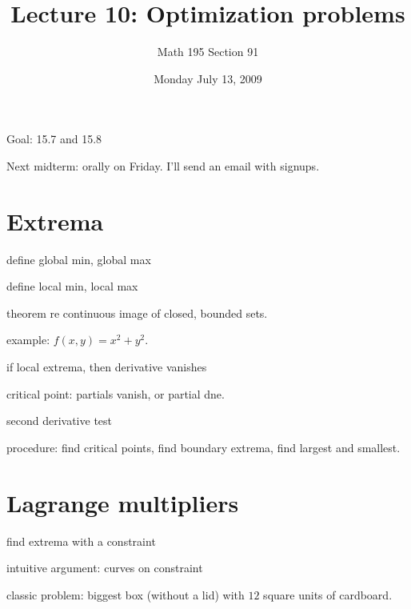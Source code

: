\documentclass[12pt]{article}
\title{Lecture 10: Optimization problems}
\author{Math 195 Section 91}
\date{Monday July 13, 2009}
\begin{document}
\maketitle

Goal: 15.7 and 15.8

Next midterm: orally on Friday.  I'll send an email with signups.

\section{Extrema}

define global min, global max

define local min, local max

theorem re continuous image of closed, bounded sets.

example: $f(x,y) = x^2 + y^2$.

if local extrema, then derivative vanishes

critical point: partials vanish, or partial dne.

second derivative test

procedure: find critical points, find boundary extrema, find largest and smallest.

\section{Lagrange multipliers}

find extrema with a constraint

intuitive argument: curves on constraint

classic problem: biggest box (without a lid) with $12$ square units of
cardboard.
\end{document}
